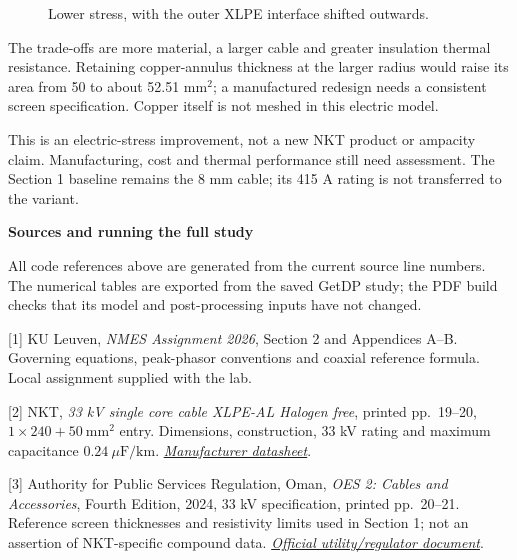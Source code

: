 \documentclass[11pt,a4paper]{article}
\newcommand{\pagetitle}[1]{{\LARGE\bfseries #1}\par\medskip}
\newcommand{\source}[2]{\href{#1}{\textit{#2}}}
\begin{document}
\begin{figure}[H]\centering
{}
\caption{Lower stress, with the outer XLPE interface shifted outwards.}
\end{figure}
The trade-offs are more material, a larger cable and greater insulation thermal
resistance. Retaining copper-annulus thickness at the larger radius would raise
its area from 50 to about 52.51 mm\(^2\); a manufactured redesign needs a
consistent screen specification. Copper itself is not meshed in this electric model.

This is an electric-stress improvement, not a new NKT product or ampacity claim.
Manufacturing, cost and thermal performance still need assessment. The Section 1
baseline remains the 8 mm cable; its 415 A rating is not transferred to the variant.

\newpage
\pagetitle{Sources and running the full study}
All code references above are generated from the current source line numbers.
The numerical tables are exported from the saved GetDP study; the PDF build
checks that its model and post-processing inputs have not changed.

\begingroup\small\setlength{\parskip}{7pt}
[1] KU Leuven, \textit{NMES Assignment 2026}, Section 2 and Appendices A--B.
Governing equations, peak-phasor conventions and coaxial reference formula.
Local assignment supplied with the lab.

[2] NKT, \textit{33 kV single core cable XLPE-AL Halogen free}, printed pp.~19--20,
\(1\times240+50~\mathrm{mm^2}\) entry. Dimensions, construction, 33 kV rating and
maximum capacitance \(0.24~\mu\mathrm F/\mathrm{km}\).
\source{https://nkt.widen.net/content/d8gut55fhb/pdf/33kV_1-core_XLPE-AL-RMP-FB-ST_CU_screen_DSENAPP_MV_DS_EN.pdf?u=gj0n1y}{Manufacturer datasheet}.

[3] Authority for Public Services Regulation, Oman, \textit{OES 2: Cables and
Accessories}, Fourth Edition, 2024, 33 kV specification, printed pp.~20--21.
Reference screen thicknesses and resistivity limits used in Section 1;
not an assertion of NKT-specific compound data.
\source{https://www.dcrp-oman.com/documents/DCRP\%20Updates/OES2\%204th\%20Edition-Circular.pdf}{Official utility/regulator document}.
\end{document}
